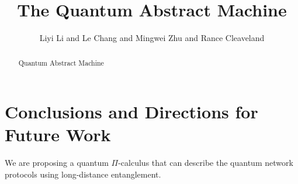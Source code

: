 \documentclass[a4paper,UKenglish,cleveref, autoref, thm-restate]{lipics-v2021}
\title{The Quantum Abstract Machine}
\author{Liyi Li and Le Chang and Mingwei Zhu and Rance Cleaveland}{ }{}{}{}%
\begin{document}
\maketitle

\begin{abstract}
Quantum Abstract Machine
\end{abstract}
















\section{Conclusions and Directions for Future Work} \label{sec:conclusions}

We are proposing a quantum $\Pi$-calculus that can describe the quantum network protocols using long-distance entanglement. 



\end{document}

